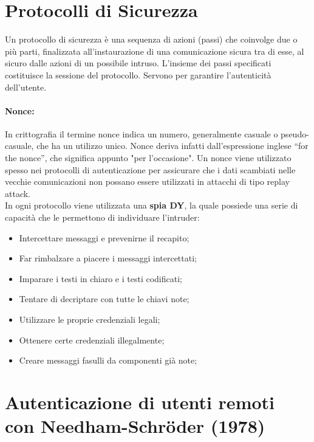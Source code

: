 \section{Protocolli di Sicurezza}

Un protocollo di sicurezza è una sequenza di azioni (passi) che
coinvolge due o più parti,
finalizzata all'instaurazione di una comunicazione sicura tra di esse,
al sicuro dalle azioni di un
possibile intruso. L'insieme dei passi specificati costituisce la sessione
del protocollo.
Servono per garantire l'autenticità dell'utente.

\paragraph{Nonce: }
In crittografia il termine nonce indica un numero, generalmente casuale
o pseudo-casuale,
che ha un utilizzo unico. Nonce deriva infatti dall'espressione inglese
“for the nonce”, che significa
appunto "per l'occasione". Un nonce viene utilizzato spesso nei protocolli
di autenticazione per
assicurare che i dati scambiati nelle vecchie comunicazioni non possano
essere utilizzati in
attacchi di tipo replay attack.\\

In ogni protocollo viene utilizzata una \textbf{spia DY}, la quale possiede una serie di capacità che le
permettono di individuare l'intruder:
\begin{itemize}
    \item Intercettare messaggi e prevenirne il recapito;
    \item Far rimbalzare a piacere i messaggi intercettati;
    \item Imparare i testi in chiaro e i testi codificati;
    \item Tentare di decriptare con tutte le chiavi note;
    \item Utilizzare le proprie credenziali legali;
    \item Ottenere certe credenziali illegalmente;
    \item Creare messaggi fasulli da componenti già note;
\end{itemize}

\section[Autenticazione di utenti remoti con Needham-Schr\"{o}der
(1978)]{Autenticazione di utenti remoti\\ con Needham-Schr\"{o}der (1978)}


